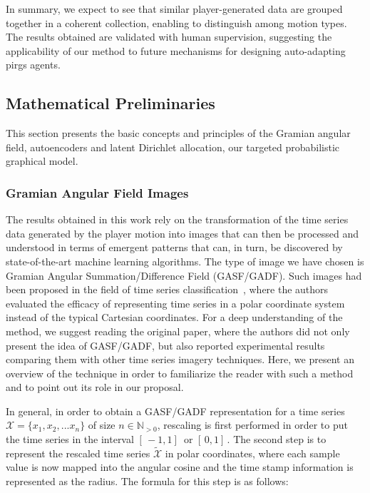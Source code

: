 In summary, we expect to see that similar player-generated data are grouped together in a coherent collection, enabling to distinguish among motion types. The results obtained are validated with human supervision, %
suggesting the applicability of our method to future mechanisms for designing auto-adapting \gls{pirg}s agents.

\subsection{Mathematical Preliminaries}

This section presents the basic concepts and principles of the Gramian angular field, autoencoders and latent Dirichlet allocation, our targeted probabilistic graphical model. %

\subsubsection{Gramian Angular Field Images}

The results obtained in this work rely on the transformation of the time series data generated by the player motion into images that can then be processed and understood in terms of emergent patterns that can, in turn, be discovered by state-of-the-art machine learning algorithms. The type of image we have chosen is Gramian Angular Summation/Difference Field (GASF/GADF). Such images had been proposed in the field of time series classification~\cite{wang_imaging_2015}, where the authors evaluated the efficacy of representing time series in a polar coordinate system instead of the typical Cartesian coordinates. For a deep understanding of the method, we suggest reading the original paper, where the authors did not only present the idea of GASF/GADF, but also reported experimental results comparing them with other time series imagery techniques. Here, we present an overview of the technique in order to familiarize the reader with such a method and to point out its role in our proposal.

In general, in order to obtain a GASF/GADF representation for a time series $\mathcal{X}=\{x_{1}, x_{2}, ... x_{n}\}$ of size $n \in \mathbb{N}_{>0}$, rescaling is first performed in order to put the time series in the interval $[\,-1,1] \,$ or $[\,0,1]\,$. The second step is to represent the rescaled time series $\widetilde{\mathcal{X}}$ in polar coordinates, where each sample value is now mapped into the angular cosine and the time stamp information is represented as the radius. 
The formula for this step is as follows:

